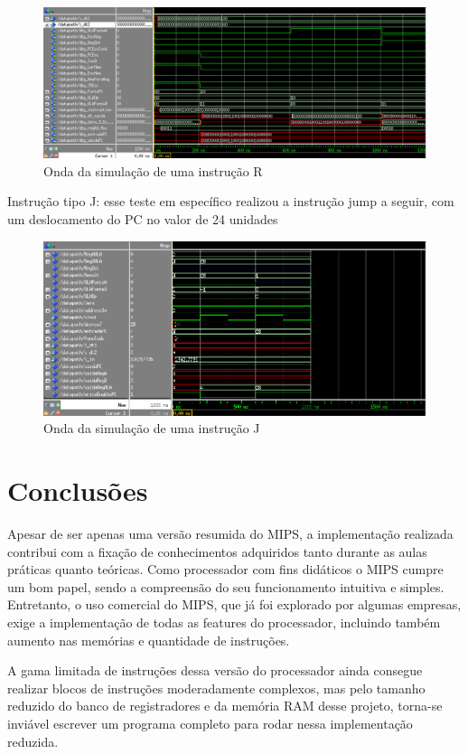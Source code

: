 \documentclass{article}
\begin{document}
    \begin{figure}[H]
        \centering
        \includegraphics[width=\textwidth]{add_wave.jpg}
        \caption{Onda da simulação de uma instrução R}
        \label{figura:mips}
    \end{figure}

    Instrução tipo J: esse teste em específico realizou a instrução jump a seguir, com um deslocamento
    do PC no valor de 24 unidades

    \begin{figure}[H]
        \centering
        \includegraphics[width=\textwidth]{jump_wave.jpg}
        \caption{Onda da simulação de uma instrução J}
        \label{figura:mips}
    \end{figure}

    \section{Conclusões}

    Apesar de ser apenas uma versão resumida do MIPS, a implementação realizada contribui com a fixação
    de conhecimentos adquiridos tanto durante as aulas práticas quanto teóricas. Como processador com fins
    didáticos o MIPS cumpre um bom papel, sendo a compreensão do seu funcionamento intuitiva e simples.
    Entretanto, o uso comercial do MIPS, que já foi explorado por algumas empresas, exige a implementação
    de todas as features do processador, incluindo também aumento nas memórias e quantidade de instruções.

    A gama limitada de instruções dessa versão do processador ainda consegue realizar blocos de instruções
    moderadamente complexos, mas pelo tamanho reduzido do banco de registradores e da memória RAM desse projeto,
    torna-se inviável escrever um programa completo para rodar nessa implementação reduzida. 
\end{document}
